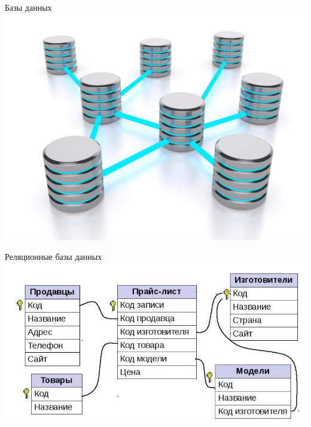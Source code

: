 \documentclass[10pt,pdf,hyperref={unicode}]{beamer}%
\begin{document}
\begin{frame}{Базы данных}
  \includegraphics[width=\textwidth]{db.jpg}
\end{frame}

\begin{frame}{Реляционные базы данных}
  \includegraphics[width=\textwidth]{rdb.png}
\end{frame}
\end{document}
